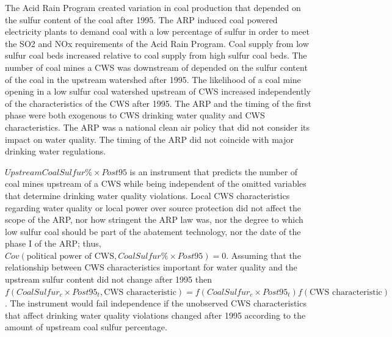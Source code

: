 \documentclass{article}
\begin{document}
The Acid Rain Program created variation in coal production that depended on the sulfur content of the coal after 1995. The ARP induced coal powered electricity plants to demand coal with a low percentage of sulfur in order to meet the SO2 and NOx requirements of the Acid Rain Program. Coal supply from low sulfur coal beds increased relative to coal supply from high sulfur coal beds. The number of coal mines a CWS was downstream of depended on the sulfur content of the coal in the upstream watershed after 1995. The likelihood of a coal mine opening in a low sulfur coal watershed upstream of CWS increased independently of the characteristics of the CWS after 1995. The ARP and the timing of the first phase were both exogenous to CWS drinking water quality and CWS characteristics. The ARP was a national clean air policy that did not consider its impact on water quality. The timing of the ARP did not coincide with major drinking water regulations. 

$UpstreamCoalSulfur\%\times Post95$ is an instrument that predicts the number of coal mines upstream of a CWS while being independent of the omitted variables that determine drinking water quality violations. Local CWS characteristics regarding water quality or local power over source protection did not affect the scope of the ARP, nor how stringent the ARP law was, nor the degree to which low sulfur coal should be part of the abatement technology, nor the date of the phase I of the ARP; thus, $Cov(\text{political power of CWS}, Coal Sulfur \% \times Post95)=0$. Assuming that the relationship between CWS characteristics important for water quality and the upstream sulfur content did not change after 1995 then $f(CoalSulfur_c \times Post95_t, \text{CWS characteristic})=f(CoalSulfur_c \times Post95_t)f(\text{CWS characteristic})$. The instrument would fail independence if the unobserved CWS characteristics that affect drinking water quality violations changed after 1995 according to the amount of upstream coal sulfur percentage.
\end{document}
